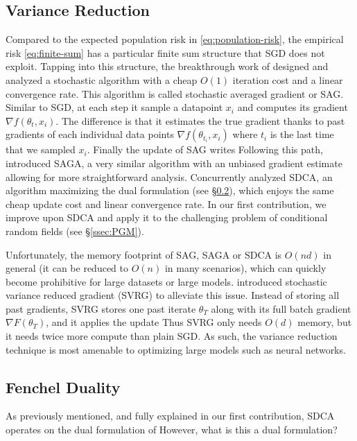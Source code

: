\subsection{Variance Reduction}
\label{ssec:variance-reduction}
Compared to the expected population risk in \cref{eq:population-risk}, the empirical risk \cref{eq:finite-sum} has a particular finite sum structure that SGD does not exploit.
Tapping into this structure, the breakthrough work of \citet{roux2012stochastic} designed and analyzed a stochastic algorithm with a  cheap $O(1)$ iteration cost and a linear convergence rate.
This algorithm is called stochastic averaged gradient or SAG.
Similar to SGD, at each step it sample a datapoint $x_i$ and computes its gradient $\nabla f(\theta_{t}, x_i)$.
The difference is that it estimates the true gradient thanks to past gradients of each individual data points $\nabla f(\theta_{t_i}, x_i)$ where $t_i$ is the last time that we sampled $x_i$.
Finally the update of SAG writes
Following this path, \citet{defazio2014saga} introduced SAGA, a very similar algorithm with an unbiased gradient estimate allowing for more straightforward analysis.
Concurrently \citet{shalev-shwartz_stochastic_2013} analyzed SDCA, an algorithm maximizing the dual formulation (see \S\ref{ssec:fenchel-duality}), which enjoys the same cheap update cost and linear convergence rate.
In our first contribution, we improve upon SDCA and apply it to the challenging problem of conditional random fields (see \S\ref{ssec:PGM}).

Unfortunately, the memory footprint of SAG, SAGA or SDCA is $O(n d)$ in general (it can be reduced to $O(n)$ in many scenarios), which can quickly become prohibitive for large datasets or large models.
\citet{johnson2013accelerating} introduced stochastic variance reduced gradient (SVRG) to alleviate this issue.
Instead of storing all past gradients, SVRG stores one past iterate $\theta_T$ along with its full batch gradient $\nabla F(\theta_T)$, and it applies the update
Thus SVRG only needs $O(d)$ memory, but it needs twice more compute than plain SGD. As such, the variance reduction technique is most amenable to optimizing large models such as neural networks.

\subsection{Fenchel Duality}
\label{ssec:fenchel-duality}
As previously mentioned, and fully explained in our first contribution, SDCA operates on the dual formulation of
However, what is this a dual formulation?

